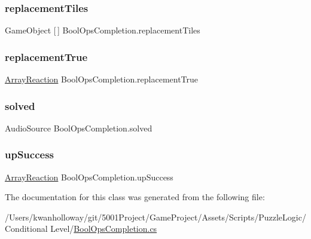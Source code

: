 \mbox{\label{class_bool_ops_completion_a5c3233d04c96464e3014aa88e9c2ff37}} 
\subsubsection{\texorpdfstring{replacement\+Tiles}{replacementTiles}}
{\footnotesize\ttfamily Game\+Object \mbox{[}$\,$\mbox{]} Bool\+Ops\+Completion.\+replacement\+Tiles}

\mbox{\label{class_bool_ops_completion_a1e2dab96d55c7681be9d553f96fa652f}} 
\subsubsection{\texorpdfstring{replacement\+True}{replacementTrue}}
{\footnotesize\ttfamily \hyperlink{class_array_reaction}{Array\+Reaction} Bool\+Ops\+Completion.\+replacement\+True}

\mbox{\label{class_bool_ops_completion_a1d343ac77c80d677ef0872217fcd5dc6}} 
\subsubsection{\texorpdfstring{solved}{solved}}
{\footnotesize\ttfamily Audio\+Source Bool\+Ops\+Completion.\+solved}

\mbox{\label{class_bool_ops_completion_a125b0cee3df92d1129222378c68776de}} 
\subsubsection{\texorpdfstring{up\+Success}{upSuccess}}
{\footnotesize\ttfamily \hyperlink{class_array_reaction}{Array\+Reaction} Bool\+Ops\+Completion.\+up\+Success}



The documentation for this class was generated from the following file\+:\begin{DoxyCompactItemize}
\item 
/\+Users/kwanholloway/git/5001\+Project/\+Game\+Project/\+Assets/\+Scripts/\+Puzzle\+Logic/\+Conditional Level/\hyperlink{_bool_ops_completion_8cs}{Bool\+Ops\+Completion.\+cs}\end{DoxyCompactItemize}
